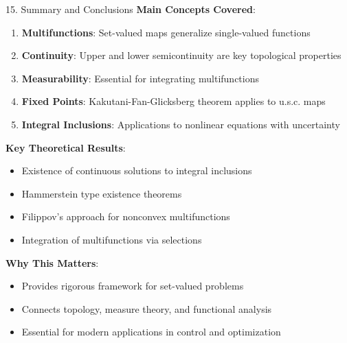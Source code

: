 \documentclass[aspectratio=169,10pt]{beamer}
\begin{document}
\begin{frame}[allowframebreaks]{15. Summary and Conclusions}
    \textbf{Main Concepts Covered}:

    \begin{enumerate}
        \item \textbf{Multifunctions}: Set-valued maps generalize single-valued functions
        \item \textbf{Continuity}: Upper and lower semicontinuity are key topological properties
        \item \textbf{Measurability}: Essential for integrating multifunctions
        \item \textbf{Fixed Points}: Kakutani-Fan-Glicksberg theorem applies to u.s.c. maps
        \item \textbf{Integral Inclusions}: Applications to nonlinear equations with uncertainty
    \end{enumerate}

    \vspace{0.4cm}
    \textbf{Key Theoretical Results}:
    \begin{itemize}
        \item Existence of continuous solutions to integral inclusions
        \item Hammerstein type existence theorems
        \item Filippov's approach for nonconvex multifunctions
        \item Integration of multifunctions via selections
    \end{itemize}

    \vspace{0.4cm}
    \textbf{Why This Matters}:
    \begin{itemize}
        \item Provides rigorous framework for set-valued problems
        \item Connects topology, measure theory, and functional analysis
        \item Essential for modern applications in control and optimization
    \end{itemize}
\end{frame}
\end{document}
